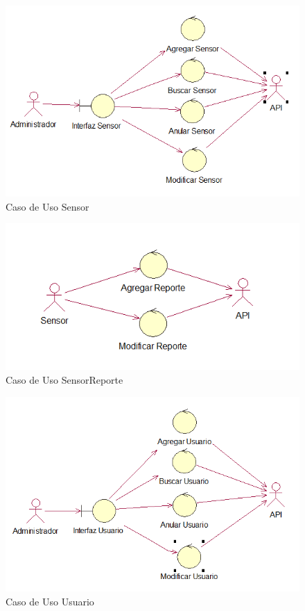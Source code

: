 \documentclass[twoside,twocolumn]{article}
\begin{document}
\begin{itemize}
\begin{figure}[h!]
\centering
\includegraphics[scale=0.45]{Image/Caso de Uso Sensor.PNG}
\caption{Caso de Uso Sensor}
\label{fig:Csha3}
\end{figure}

\begin{figure}[h!]
\centering
\includegraphics[scale=0.45]{Image/Caso de Uso SensorReporte.PNG}
\caption{Caso de Uso SensorReporte}
\label{fig:Csha3}
\end{figure}

\begin{figure}[h!]
\centering
\includegraphics[scale=0.45]{Image/Caso de Uso Usuario.PNG}
\caption{Caso de Uso Usuario}
\label{fig:Csha3}
\end{figure}


\end{itemize}
\end{document}
